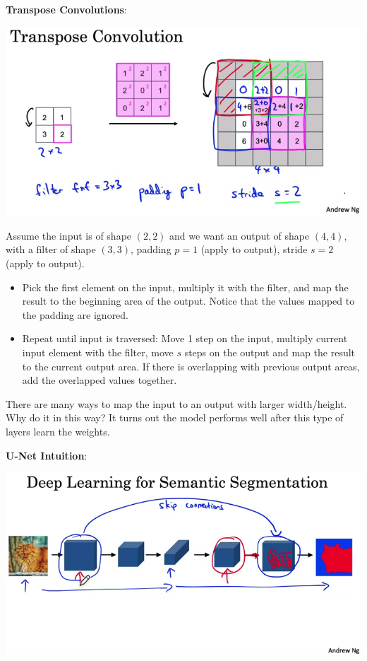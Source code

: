 \documentclass{article}
\begin{document}
\noindent \textbf{Transpose Convolutions}:

\begin{center}
\includegraphics[scale=0.4]{./images/transpose_convolution.png}
\end{center}

\noindent Assume the input is of shape \((2, 2)\) and we want an output of shape \((4, 4)\), with a filter of shape \((3, 3)\), padding \(p = 1\) (apply to output), stride \(s = 2\) (apply to output).

\begin{itemize}
    \item Pick the first element on the input, multiply it with the filter, and map the result to the beginning area of the output. Notice that the values mapped to the padding are ignored.
    \item Repeat until input is traversed: Move 1 step on the input, multiply current input element with the filter, move \(s\) steps on the output and map the result to the current output area. If there is overlapping with previous output areas, add the overlapped values together.
\end{itemize}

\noindent There are many ways to map the input to an output with larger width/height. Why do it in this way? It turns out the model performs well after this type of layers learn the weights.

\bigskip

\noindent \textbf{U-Net Intuition}:

\begin{center}
\includegraphics[scale=0.4]{./images/unet_intuition.png}
\end{center}
\end{document}
